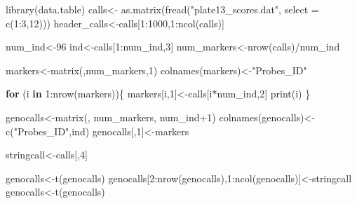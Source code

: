 \documentclass[
]{article}
\newenvironment{Shaded}{\begin{snugshade}}{\end{snugshade}}
\newcommand{\AttributeTok}[1]{\textcolor[rgb]{0.77,0.63,0.00}{#1}}
\newcommand{\ControlFlowTok}[1]{\textcolor[rgb]{0.13,0.29,0.53}{\textbf{#1}}}
\newcommand{\DecValTok}[1]{\textcolor[rgb]{0.00,0.00,0.81}{#1}}
\newcommand{\FunctionTok}[1]{\textcolor[rgb]{0.00,0.00,0.00}{#1}}
\newcommand{\NormalTok}[1]{#1}
\newcommand{\OtherTok}[1]{\textcolor[rgb]{0.56,0.35,0.01}{#1}}
\newcommand{\SpecialCharTok}[1]{\textcolor[rgb]{0.00,0.00,0.00}{#1}}
\newcommand{\StringTok}[1]{\textcolor[rgb]{0.31,0.60,0.02}{#1}}
\begin{document}
\begin{Shaded}
\begin{Highlighting}[]
\FunctionTok{library}\NormalTok{(data.table)}
\NormalTok{calls}\OtherTok{\textless{}{-}} \FunctionTok{as.matrix}\NormalTok{(}\FunctionTok{fread}\NormalTok{(}\StringTok{"plate13\_scores.dat"}\NormalTok{, }\AttributeTok{select =} \FunctionTok{c}\NormalTok{(}\DecValTok{1}\SpecialCharTok{:}\DecValTok{3}\NormalTok{,}\DecValTok{12}\NormalTok{)))}
\NormalTok{header\_calls}\OtherTok{\textless{}{-}}\NormalTok{calls[}\DecValTok{1}\SpecialCharTok{:}\DecValTok{1000}\NormalTok{,}\DecValTok{1}\SpecialCharTok{:}\FunctionTok{ncol}\NormalTok{(calls)]}

\NormalTok{num\_ind}\OtherTok{\textless{}{-}}\DecValTok{96}
\NormalTok{ind}\OtherTok{\textless{}{-}}\NormalTok{calls[}\DecValTok{1}\SpecialCharTok{:}\NormalTok{num\_ind,}\DecValTok{3}\NormalTok{]}
\NormalTok{num\_markers}\OtherTok{\textless{}{-}}\FunctionTok{nrow}\NormalTok{(calls)}\SpecialCharTok{/}\NormalTok{num\_ind}

\NormalTok{markers}\OtherTok{\textless{}{-}}\FunctionTok{matrix}\NormalTok{(,num\_markers,}\DecValTok{1}\NormalTok{)}
\FunctionTok{colnames}\NormalTok{(markers)}\OtherTok{\textless{}{-}}\StringTok{"Probes\_ID"}

\ControlFlowTok{for}\NormalTok{ (i }\ControlFlowTok{in} \DecValTok{1}\SpecialCharTok{:}\FunctionTok{nrow}\NormalTok{(markers))\{}
\NormalTok{  markers[i,}\DecValTok{1}\NormalTok{]}\OtherTok{\textless{}{-}}\NormalTok{calls[i}\SpecialCharTok{*}\NormalTok{num\_ind,}\DecValTok{2}\NormalTok{]}
  \FunctionTok{print}\NormalTok{(i)}
\NormalTok{\}}


\NormalTok{genocalls}\OtherTok{\textless{}{-}}\FunctionTok{matrix}\NormalTok{(, num\_markers, num\_ind}\SpecialCharTok{+}\DecValTok{1}\NormalTok{)}
\FunctionTok{colnames}\NormalTok{(genocalls)}\OtherTok{\textless{}{-}}\FunctionTok{c}\NormalTok{(}\StringTok{"Probes\_ID"}\NormalTok{,ind)}
\NormalTok{genocalls[,}\DecValTok{1}\NormalTok{]}\OtherTok{\textless{}{-}}\NormalTok{markers}

\NormalTok{stringcall}\OtherTok{\textless{}{-}}\NormalTok{calls[,}\DecValTok{4}\NormalTok{]}

\NormalTok{genocalls}\OtherTok{\textless{}{-}}\FunctionTok{t}\NormalTok{(genocalls)}
\NormalTok{genocalls[}\DecValTok{2}\SpecialCharTok{:}\FunctionTok{nrow}\NormalTok{(genocalls),}\DecValTok{1}\SpecialCharTok{:}\FunctionTok{ncol}\NormalTok{(genocalls)]}\OtherTok{\textless{}{-}}\NormalTok{stringcall}
\NormalTok{genocalls}\OtherTok{\textless{}{-}}\FunctionTok{t}\NormalTok{(genocalls)}



\end{Highlighting}
\end{Shaded}
\end{document}

